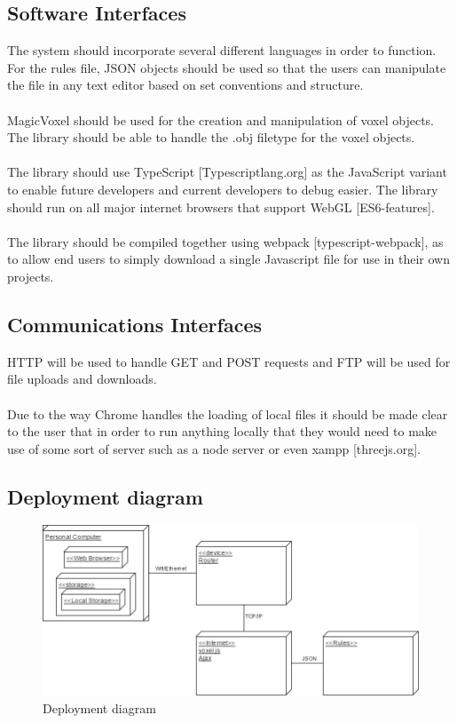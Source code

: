 \documentclass[english]{article}
\begin{document}
		\subsection{Software Interfaces}
		The system should incorporate several different languages in order to function. For the rules file, JSON objects should be 
		used so that the users can manipulate the file in any text editor based on set conventions and structure. 
		\\\\
		MagicVoxel should be used for the creation and manipulation of voxel objects. The library should be able to handle the .obj filetype for the voxel objects.
		\\\\
	 	The library should use TypeScript [Typescriptlang.org] as the JavaScript variant to enable future developers and current developers to debug easier. The library should run on all major internet browsers that support WebGL [ES6-features].
	 	\\\\
	 	The library should be compiled together using webpack [typescript-webpack], as to allow end users to simply download a single Javascript file for use in their own projects.
		
		\subsection{Communications Interfaces}
		HTTP will be used to handle GET and POST requests and FTP will be used for file uploads and downloads.
		\\\\
		Due to the way Chrome handles the loading of local files it should be made clear to the user that in order to run anything locally that they would need to make use of some sort of server such as a node server or even xampp [threejs.org].
	\pagebreak
	
			\subsection{Deployment diagram}
	\begin{figure}[h]
		\includegraphics[width=\textwidth]{Voxel Deployment Diagram.jpg}
		\caption{Deployment diagram }
	\end{figure}
	
\end{document}
